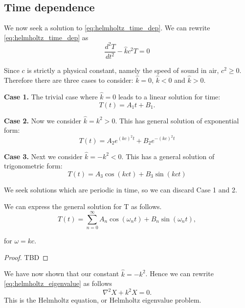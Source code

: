 \subsection{Time dependence}\label{ss:time_dependece}
We now seek a solution to \eqref{eq:helmholtz_time_dep}. We can rewrite \eqref{eq:helmholtz_time_dep} as
    \begin{equation}\label{eq:helmholtz_time_dep_1}
        \frac{d^2 T}{dt^2} - \hat{k}c^2 T = 0
    \end{equation}\par
%
Since $c$ is strictly a physical constant, namely the speed of sound in air, $c^2 \geq 0$. Therefore there are three cases to consider: $\hat{k} = 0$, $\hat{k} < 0$ and $\hat{k} > 0$.\par
%
\textbf{Case 1.} The trivial case where $\hat{k} = 0$ leads to a linear solution for time:
    \begin{equation}
        T(t) = A_1 t + B_1.
    \end{equation}\par
%
\textbf{Case 2.} Now we consider $\hat{k} = k^2 > 0$. This has general solution of exponential form:
    \begin{equation}
        T(t) = A_2 e^{(kc)^2 t} + B_2 e^{-(kc)^2t}
    \end{equation}\par
%
\textbf{Case 3.} Next we consider $\hat{k}= -k^2 <0$. This has a general solution of trigonometric form:
    \begin{equation}
        T(t) = A_3 \cos(kct) + B_3 \sin(kct)
    \end{equation}
\par
%
We seek solutions which are periodic in time, so we can discard Case 1 and 2. \par
%
    \begin{propn} \label{propn:trig_sum_solution}
    We can express the general solution for T as follows.
        \begin{equation}\label{eq:helmholtz_time_sum}
            T(t) = \sum^\infty_{n = 0} A_n \cos(\omega_n t) + B_n \sin(\omega_n t),
        \end{equation}
    \end{propn}
    for $\omega = kc.$
    \begin{proof}
    TBD
    \end{proof}\par
%
We have now shown that our constant $\hat{k} = - k^2$. Hence we can rewrite \eqref{eq:helmholtz_eigenvalue} as follows
    \begin{equation}\label{eq:helmholtz}
        \nabla^2 X + k^2X = 0.
    \end{equation}
This is the Helmholtz equation, or Helmholtz eigenvalue problem.
%
